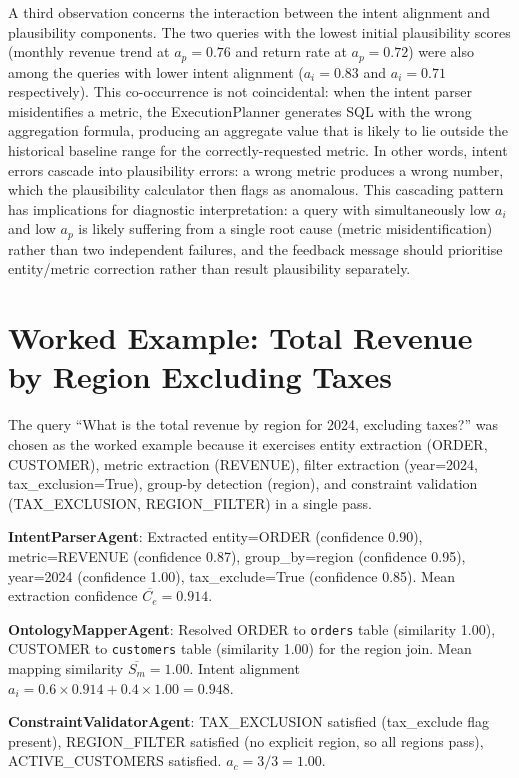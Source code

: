 \documentclass[12pt,a4paper]{report}
\begin{document}
A third observation concerns the interaction between the intent alignment and plausibility components. The two queries with the lowest initial plausibility scores (monthly revenue trend at $a_p = 0.76$ and return rate at $a_p = 0.72$) were also among the queries with lower intent alignment ($a_i = 0.83$ and $a_i = 0.71$ respectively). This co-occurrence is not coincidental: when the intent parser misidentifies a metric, the ExecutionPlanner generates SQL with the wrong aggregation formula, producing an aggregate value that is likely to lie outside the historical baseline range for the correctly-requested metric. In other words, intent errors cascade into plausibility errors: a wrong metric produces a wrong number, which the plausibility calculator then flags as anomalous. This cascading pattern has implications for diagnostic interpretation: a query with simultaneously low $a_i$ and low $a_p$ is likely suffering from a single root cause (metric misidentification) rather than two independent failures, and the feedback message should prioritise entity/metric correction rather than result plausibility separately.

\section{Worked Example: Total Revenue by Region Excluding Taxes}
\label{sec:worked-example}

The query ``What is the total revenue by region for 2024, excluding taxes?'' was chosen as the worked example because it exercises entity extraction (ORDER, CUSTOMER), metric extraction (REVENUE), filter extraction (year=2024, tax\_exclusion=True), group-by detection (region), and constraint validation (TAX\_EXCLUSION, REGION\_FILTER) in a single pass.

\textbf{IntentParserAgent}: Extracted entity=ORDER (confidence 0.90), metric=REVENUE (confidence 0.87), group\_by=region (confidence 0.95), year=2024 (confidence 1.00), tax\_exclude=True (confidence 0.85). Mean extraction confidence $\overline{C_e} = 0.914$.

\textbf{OntologyMapperAgent}: Resolved ORDER to \texttt{orders} table (similarity 1.00), CUSTOMER to \texttt{customers} table (similarity 1.00) for the region join. Mean mapping similarity $\overline{S_m} = 1.00$. Intent alignment $a_i = 0.6 \times 0.914 + 0.4 \times 1.00 = 0.948$.

\textbf{ConstraintValidatorAgent}: TAX\_EXCLUSION satisfied (tax\_exclude flag present), REGION\_FILTER satisfied (no explicit region, so all regions pass), ACTIVE\_CUSTOMERS satisfied. $a_c = 3/3 = 1.00$.
\end{document}
